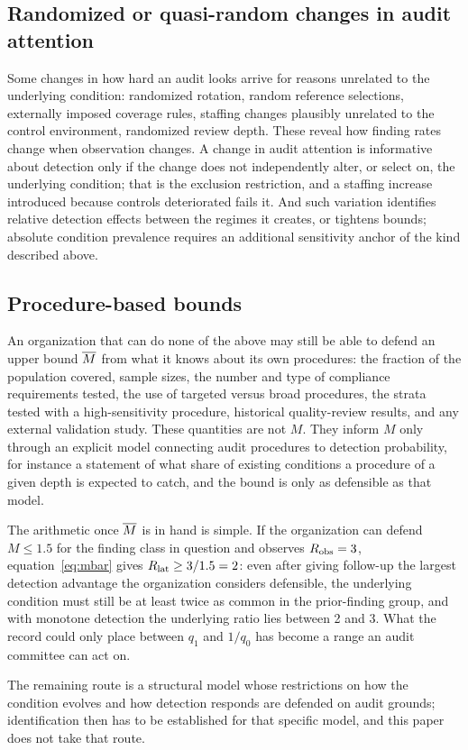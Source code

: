 \subsection{Randomized or quasi-random changes in audit attention}

Some changes in how hard an audit looks arrive for reasons unrelated to the
underlying condition: randomized rotation, random reference selections,
externally imposed coverage rules, staffing changes plausibly unrelated to the
control environment, randomized review depth. These reveal how finding rates
change when observation changes. A change in audit attention is informative
about detection only if the change does not independently alter, or select
on, the underlying condition; that is the exclusion restriction, and a
staffing increase introduced because controls deteriorated fails it. And such
variation identifies relative detection effects between the regimes it
creates, or tightens bounds; absolute condition prevalence requires
an additional sensitivity anchor of the kind described above.

\subsection{Procedure-based bounds}

An organization that can do none of the above may still be able to defend an
upper bound $\overline{M}$ from what it knows about its own procedures: the fraction
of the population covered, sample sizes, the number and type of compliance
requirements tested, the use of targeted versus broad procedures, the strata
tested with a high-sensitivity procedure, historical quality-review results,
and any external validation study. These quantities are not $M$. They inform
$M$ only through an explicit model connecting audit procedures to detection
probability, for instance a statement of what share of existing conditions a
procedure of a given depth is expected to catch, and the bound is only as
defensible as that model.

The arithmetic once $\overline{M}$ is in hand is simple. If the organization can
defend $M \le 1.5$ for the finding class in question and observes $R_{\mathrm{obs}} =
3$, equation~\eqref{eq:mbar} gives $R_{\mathrm{lat}} \ge 3/1.5 = 2$: even after giving
follow-up the largest detection advantage the organization considers
defensible, the underlying condition must still be at least twice as common
in the prior-finding group, and with monotone detection the underlying ratio
lies between 2 and 3. What the record could only place between $q_1$ and
$1/q_0$ has become a range an audit committee can act on.

The remaining route is a structural model whose restrictions on how the
condition evolves and how detection responds are defended on audit grounds;
identification then has to be established for that specific model, and this
paper does not take that route.


